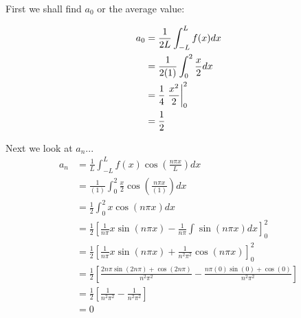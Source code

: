 \documentclass[10pt,letterpaper,twoside,final]{memoir}
\begin{document}
First we shall find $a_0$ or the average value:
\begin{mathstuff}
\begin{align*}
a_0 &= \frac{1}{2L} \int_{-L}^L f(x) dx  \\
    &= \frac{1}{2(1)} \int_0^{2} \frac{x}{2} dx \\
    &= \frac{1}{4} \left. \frac{x^2}{2} \vphantom{\frac{1}{2}} \right|^2_0 \\
    &= \frac{1}{2}
\end{align*}
\end{mathstuff}

Next we look at $a_n$...
\begin{align*}
a_n &= \frac{1}{L}  \int_{-L}^L f(x) \cos \left( \frac{n\pi x}{L} \right) dx \\
    &= \frac{1}{(1)} \int_0^2 \frac{x}{2} \cos \left( \frac{n\pi x}{(1)} \right) dx \\
    &= \frac{1}{2} \int_0^2 x \cos \left( n\pi x \right) dx \\
    &= \frac{1}{2} \left[ \frac{1}{n\pi} x \sin \left( n\pi x \right) - \frac{1}{n\pi} \int \sin \left( n\pi x \right) dx \right]^2_0 \\
    &= \frac{1}{2} \left[ \frac{1}{n\pi} x \sin \left( n\pi x \right) + \frac{1}{n^2\pi^2} \cos \left( n\pi x \right) \right]^2_0 \\
    &= \frac{1}{2} \left[ \frac{2n\pi \sin \left( 2n\pi \right) + \cos \left( 2n\pi \right)}{n^2\pi^2} - \frac{n\pi (0) \sin \left(0 \right) + \cos \left( 0 \right)}{n^2\pi^2} \right] \\
    &= \frac{1}{2} \left[ \frac{1}{n^2\pi^2} - \frac{1}{n^2\pi^2} \right] \\
    &= 0
\end{align*}
\end{document}
